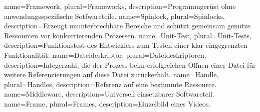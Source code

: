 \makeglossaries 

{
	name={Framework},  
	plural={Frameworks},
	description={Programmgerüst ohne anwendungsspezifische Sotfwareteile. \citep[S. 847]{gumm2011einfuhrung}}
}  
{
	name={Spinlock},  
	plural={Spinlocks},
	description={Erzeugt ununterbrechbare Bereiche und schützt gemeinsam genutze Ressourcen vor konkurrierenden Prozessen.  \citep[S. 261]{schroder2009embedded}}
}  
{
	name={Unit-Test},  
	plural={Unit-Tests},
	description={Funktionstest des Entwicklers zum Testen einer klar eingegrenzten Funktionalität. \citep[S. 3]{hunt2004unit}}
}  
{
	name={Datei\-deskriptor},  
	plural={Datei\-deskriptoren},
	description={Integerzahl, die der Prozess beim erfolgreichen Öffnen einer Datei für weitere Referenzierungen auf diese Datei zurückerhält. \citep[S. 25]{beck1994linux}}
}  
{
	name={Handle},  
	plural={Handles},
	description={Referenz auf eine bestimmte Ressource.}
} 
{
	name={Middleware},  
	description={Universell einsetzbarer Softwareteil. \citep[S. 487]{sommerville2011software}}
} 
{
	name={Frame},
	plural={Frames},  
	description={Einzelbild eines Videos.}
} 